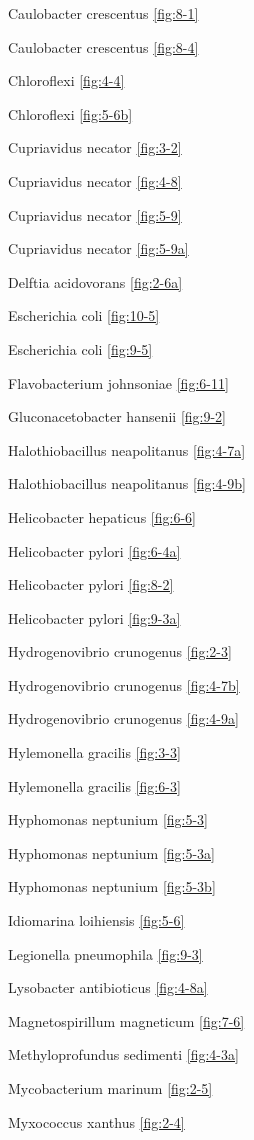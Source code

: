 \documentclass[]{tufte-book}
\begin{document}
Caulobacter crescentus \ref{fig:8-1}

Caulobacter crescentus \ref{fig:8-4}

Chloroflexi \ref{fig:4-4}

Chloroflexi \ref{fig:5-6b}

Cupriavidus necator \ref{fig:3-2}

Cupriavidus necator \ref{fig:4-8}

Cupriavidus necator \ref{fig:5-9}

Cupriavidus necator \ref{fig:5-9a}

Delftia acidovorans \ref{fig:2-6a}

Escherichia coli \ref{fig:10-5}

Escherichia coli \ref{fig:9-5}

Flavobacterium johnsoniae \ref{fig:6-11}

Gluconacetobacter hansenii \ref{fig:9-2}

Halothiobacillus neapolitanus \ref{fig:4-7a}

Halothiobacillus neapolitanus \ref{fig:4-9b}

Helicobacter hepaticus \ref{fig:6-6}

Helicobacter pylori \ref{fig:6-4a}

Helicobacter pylori \ref{fig:8-2}

Helicobacter pylori \ref{fig:9-3a}

Hydrogenovibrio crunogenus \ref{fig:2-3}

Hydrogenovibrio crunogenus \ref{fig:4-7b}

Hydrogenovibrio crunogenus \ref{fig:4-9a}

Hylemonella gracilis \ref{fig:3-3}

Hylemonella gracilis \ref{fig:6-3}

Hyphomonas neptunium \ref{fig:5-3}

Hyphomonas neptunium \ref{fig:5-3a}

Hyphomonas neptunium \ref{fig:5-3b}

Idiomarina loihiensis \ref{fig:5-6}

Legionella pneumophila \ref{fig:9-3}

Lysobacter antibioticus \ref{fig:4-8a}

Magnetospirillum magneticum \ref{fig:7-6}

Methyloprofundus sedimenti \ref{fig:4-3a}

Mycobacterium marinum \ref{fig:2-5}

Myxococcus xanthus \ref{fig:2-4}
\end{document}
